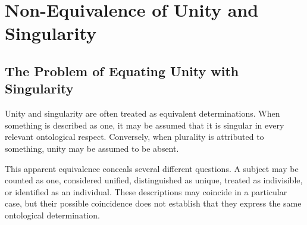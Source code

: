 %
%
%
%
%

\section{Non-Equivalence of Unity and Singularity}
\label{sec:non-equivalence-of-unity-and-singularity}

\subsection{The Problem of Equating Unity with Singularity}

Unity and singularity are often treated as equivalent
determinations. When something is described as one, it may
be assumed that it is singular in every relevant ontological
respect. Conversely, when plurality is attributed to
something, unity may be assumed to be absent.

This apparent equivalence conceals several different
questions. A subject may be counted as one, considered
unified, distinguished as unique, treated as indivisible,
or identified as an individual. These descriptions may
coincide in a particular case, but their possible
coincidence does not establish that they express the
same ontological determination.

